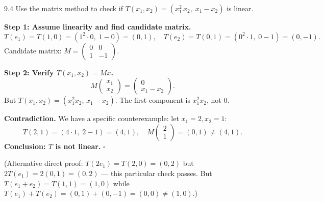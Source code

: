 \begin{exercise}{9.4}
Use the matrix method to check if $T(x_1,x_2)=(x_1^2\,x_2,\;x_1-x_2)$ is linear.
\end{exercise}
\begin{solution}
\textbf{Step 1: Assume linearity and find candidate matrix.}
\[
T(e_1)=T(1,0)=(1^2\cdot0,\;1-0)=(0,1),\quad T(e_2)=T(0,1)=(0^2\cdot1,\;0-1)=(0,-1).
\]
Candidate matrix: $M=\begin{pmatrix}0&0\\1&-1\end{pmatrix}$.

\textbf{Step 2: Verify $T(x_1,x_2)=Mx$.}
\[
M\begin{pmatrix}x_1\\x_2\end{pmatrix}=\begin{pmatrix}0\\x_1-x_2\end{pmatrix}.
\]
But $T(x_1,x_2)=(x_1^2 x_2,\,x_1-x_2)$. The first component is $x_1^2 x_2$, not $0$.

\textbf{Contradiction.} We have a specific counterexample: let $x_1=2,x_2=1$:
\[
T(2,1)=(4\cdot1,\;2-1)=(4,1),\quad M\begin{pmatrix}2\\1\end{pmatrix}=(0,1)\neq(4,1).
\]
\textbf{Conclusion: $T$ is not linear.} $\square$

(Alternative direct proof: $T(2e_1)=T(2,0)=(0,2)$ but $2T(e_1)=2(0,1)=(0,2)$ --- this particular check passes. But $T(e_1+e_2)=T(1,1)=(1,0)$ while $T(e_1)+T(e_2)=(0,1)+(0,-1)=(0,0)\neq(1,0)$.)
\end{solution}
